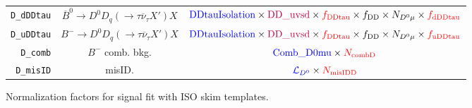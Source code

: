 \begin{landscape}
\begin{table}
\begin{tabular}{r|c|c}
       \texttt{D\_dDDtau} &   $\overline{B}^0 \rightarrow D^0 D_q (\rightarrow \tau \overline{\nu}_\tau X') X$   &                                                                               $\textcolor{blue}{\text{DDtauIsolation}} \times \textcolor{purple}{\text{DD\_uvsd}} \times \textcolor{red}{f_\text{DDtau}} \times f_\text{DD} \times N_{D^0 \mu} \times \textcolor{red}{f_\text{dDDtau}}$                                                                               \\
       \texttt{D\_uDDtau} &        $B^- \rightarrow D^0 D_q (\rightarrow \tau \overline{\nu}_\tau X') X$         &                                                                               $\textcolor{blue}{\text{DDtauIsolation}} \times \textcolor{purple}{\text{DD\_uvsd}} \times \textcolor{red}{f_\text{DDtau}} \times f_\text{DD} \times N_{D^0 \mu} \times \textcolor{red}{f_\text{uDDtau}}$                                                                               \\
         \texttt{D\_comb} &                                   $B^-$ comb. bkg.                                   &                                                                                                                                             $\textcolor{blue}{\text{Comb\_D0mu}} \times \textcolor{red}{N_\text{combD}}$                                                                                                                                              \\
        \texttt{D\_misID} &                                        misID.                                        &                                                                                                                                             $\textcolor{blue}{\mathcal{L}_{D^0}} \times \textcolor{red}{N_\text{misIDD}}$                                                                                                                                             \\
\bottomrule
\end{tabular}

\end{table}
\end{landscape}
\restoregeometry


\begin{landscape}
\begin{table}
\centering
\caption{
    Normalization factors for \Dstar signal fit with ISO skim templates.
}
\label{tab:fit-norm-fact-dst}
\scriptsize


\end{table}
\end{landscape}
